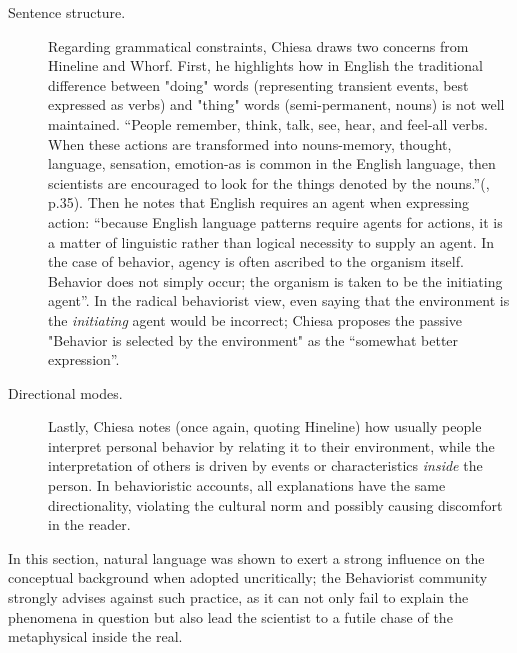 \documentclass[letterpaper,11pt,twocolumn]{article}
\begin{document}
\begin{description}
    \item[Sentence structure.] Regarding grammatical constraints, Chiesa draws two concerns from Hineline\cite{hinelineLanguageBehaviorAnalysis1980} and Whorf\cite{whorfLanguageThoughtReality1956}. First, he highlights how in English the traditional difference between "doing" words (representing transient events, best expressed as verbs) and "thing" words (semi-permanent, nouns) is not well maintained. \enquote{People remember, think, talk, see, hear, and feel-all verbs. When these actions are transformed into nouns-memory, thought, language, sensation, emotion-as is common in the English language, then scientists are encouraged to look for the things denoted by the nouns.}(\cite{chiesaRadicalBehaviorismPhilosophy1994}, p.35). Then he notes that English requires an agent when expressing action: \enquote{because English language patterns require agents for actions, it is a matter of linguistic rather than logical necessity to supply an agent. In the case of behavior, agency is often ascribed to the organism itself. Behavior does not simply occur; the organism is taken to be the initiating agent}. In the radical behaviorist view, even saying that the environment is the \textit{initiating} agent would be incorrect; Chiesa proposes the passive "Behavior is selected by the environment" as the   \enquote{somewhat better expression}.
    \item[Directional modes.] Lastly, Chiesa notes (once again, quoting Hineline) how usually people interpret personal behavior by relating it to their environment, while the interpretation of others is driven by events or characteristics \textit{inside} the person. In behavioristic accounts, all explanations have the same directionality, violating the cultural norm and possibly causing discomfort in the reader.
\end{description}
In this section, natural language was shown to exert a strong influence on the conceptual background when adopted uncritically; the Behaviorist community strongly advises against such practice, as it can not only fail to explain the phenomena in question but also lead the scientist to a futile chase of the metaphysical inside the real.
\end{document}
